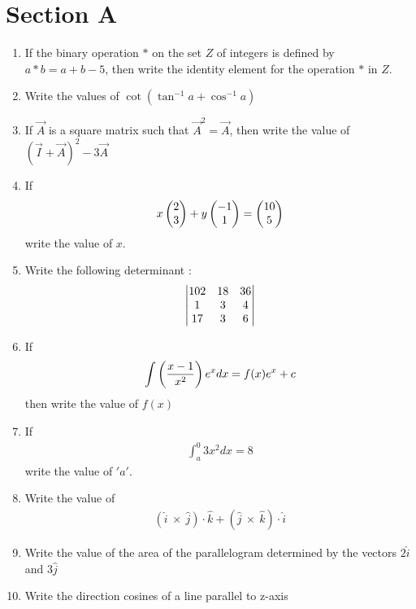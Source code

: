 \documentclass[journal,12pt,twocolumn]{IEEEtran}
\renewcommand\thesection{\arabic{section}}
\begin{document}
\section{Section A}
\renewcommand{\theequation}{\theenumi}
\begin{enumerate}[label=\thesection.\arabic*.,ref=\thesection.\theenumi]
\item If the binary operation $*$ on the set $Z$ of integers is defined by $a*b=a+b-5$, then write the identity element for the operation $*$ in $Z$.\\
\item Write the values of $\cot(\tan^{-1}a+\cos^{-1}a)$ \\
\item If $\vec{A}$ is a square matrix such that $\vec{A}^2 = \vec{A}$, then write the value of $(\vec{I}+\vec{A})^2-3\vec{A}$\\
\item If 
\begin{align}
    x \begin{pmatrix}2\\3\end{pmatrix} +y\begin{pmatrix}-1 \\ 1 \end{pmatrix} = \begin{pmatrix} 10 \\ 5\end{pmatrix}
\end{align} write the value of $x$.\\
\item Write the following determinant : 
\begin{align}
\begin{vmatrix} 102 & 18 & 36 \\ 1 & 3 & 4\\ 17 & 3 & 6\end{vmatrix} \nonumber
\end{align}
\item If 
\begin{align}
    \int\left(\frac{x-1}{x^2}\right)e^{x}dx= f(x)e^{x}+c \nonumber
\end{align}
then write the value of $f(x)$\\
\item If 
\begin{align}
\int_{a}^{0}3x^{2}dx=8
\end{align}
write the value of $'a'$.\\
\item Write the value of 
\begin{align}
(\hat{i} \ \times \ \hat{j})\cdot\hat{k}+(\hat{j} \ \times \ \hat{k})\cdot\hat{i} \nonumber
\end{align}
\item Write the value of the area of the parallelogram determined by the vectors $2\hat{i}$ and $3\hat{j}$\\
\item Write the direction cosines of a line parallel to z-axis\\
\end{enumerate}
\end{document}
